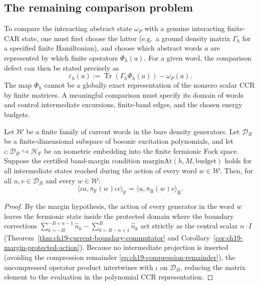 \subsection*{The remaining comparison problem}

To compare the interacting abstract state $\omega_P$ with a genuine
interacting finite-CAR state, one must first choose the latter
(e.g.\ a ground density matrix $\Gamma_h$ for a specified finite
Hamiltonian), and choose which abstract words $a$ are represented
by which finite operators $\Phi_h(a)$.  For a given word, the
comparison defect can then be stated precisely as
\begin{equation}
 \varepsilon_h(a)
  :=\operatorname{Tr}(\Gamma_h\Phi_h(a))-\omega_P(a).
 \label{eq:ch19-comp-comparison-defect}
\end{equation}
The map $\Phi_h$ cannot be a globally exact representation of the
nonzero scalar CCR by finite matrices.  A meaningful comparison must
specify its domain of words and control intermediate excursions,
finite-band edges, and the chosen energy budgets.

\begin{theorem}
\label{thm:ch19-protected-bridge}
Let $\mathcal W$ be a finite family of current words in the bare density generators.
Let $\mathcal D_B$ be a finite-dimensional subspace of bosonic excitation polynomials,
and let $\iota\colon \mathcal D_B \hookrightarrow \mathcal H_{\mathrm F}$ be an isometric
embedding into the finite fermionic Fock space.
Suppose the certified band-margin condition $\mathrm{marginAt}(h, M, \mathrm{budget})$
holds for all intermediate states reached during the action of every word $w \in \mathcal W$.
Then, for all $u, v \in \mathcal D_B$ and every $w \in \mathcal W$:
\begin{equation}
 \boxed{\langle\iota u, \pi_{\mathrm F}(w) \iota v\rangle_{\mathrm F}
  = \langle u, \pi_{\mathrm B}(w) v\rangle_{\mathrm B}.}
 \label{eq:ch19-word-bridge}
\end{equation}
\end{theorem}
\begin{proof}
By the margin hypothesis, the action of every generator in the word $w$ leaves the
fermionic state inside the protected domain where the boundary corrections
$\sum_{k=-B}^{-B+n-1} \hat{n}_k - \sum_{k=B-n+1}^B \hat{n}_k$ act strictly as the central
scalar $n\cdot I$ (Theorem~\ref{thm:ch19-current-boundary-commutator} and
Corollary~\ref{cor:ch19-margin-protected-action}).
Because no intermediate projection is inserted (avoiding the compression remainder
\eqref{eq:ch19-compression-remainder}), the uncompressed operator product intertwines with
$\iota$ on $\mathcal D_B$, reducing the matrix element to the evaluation in the polynomial
CCR representation.
\end{proof}

